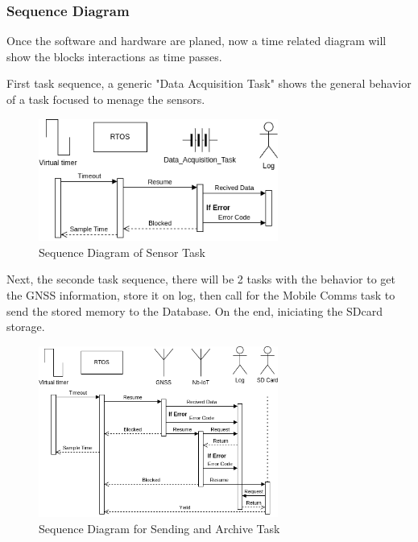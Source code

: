 \subsubsection{Sequence Diagram}

Once the software and hardware are planed, now a time related diagram will show the blocks interactions
as time passes.

First task sequence, a generic "Data Acquisition Task" shows the general behavior of a task focused to menage the sensors.

\begin{figure}[H]
    \centering
    \includegraphics[width=0.7\textwidth]{images/diagrams/sequence_diagram/sequence_diagram_1/Sequence Diagram.drawio.png}  %
    \caption{Sequence Diagram of Sensor Task}
    \label{fig:Sequence Diagram of Sensor Task}
\end{figure}

Next, the seconde task sequence, there will be 2 tasks with the behavior to get the GNSS information, store it on log, then call for the Mobile Comms task to send the stored memory to the Database.
On the end, iniciating the SDcard storage. 
\begin{figure}[H]
    \centering
    \includegraphics[width=0.7\textwidth]{images/diagrams/sequence_diagram/sequence_diagram_2/Sequence Diagram.drawio.png}  %
    \caption{Sequence Diagram for Sending and Archive Task}
    \label{fig:Sequence Diagram for Sending and Archive Task}        
\end{figure}

